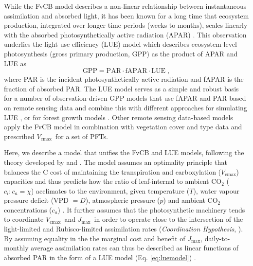 \documentclass{myreport}
\newcommand{\vcmax}{$V_{\text{cmax}}$}
\newcommand{\jmax}{$J_{\text{max}}$}
\begin{document}
While the FvCB model describes a non-linear relationship between instantaneous assimilation and absorbed light, it has been known for a long time that ecosystem production, integrated over longer time periods (weeks to months), scales linearly with the absorbed photosynthetically active radiation (APAR) \citep{monteith72, medlyn98}. This observation underlies the light use efficiency (LUE) model which describes ecosystem-level photosynthesis (gross primary production, GPP) as the product of APAR and LUE as
\begin{equation}
\label{eq:luemodel}
\text{GPP} = \text{PAR} \cdot \text{fAPAR} \cdot \text{LUE} \;,
\end{equation}
where PAR is the incident photosynthetically active radiation and fAPAR is the fraction of absorbed PAR. The LUE model serves as a simple and robust basis for a number of observation-driven GPP models that use fAPAR and PAR based on remote sensing data and combine this with different approaches for simulating LUE \citep{running04, Zhang2017-yr, field95rse}, or for forest growth models \citep{landsberg97fem}. Other remote sensing data-based models \citep{jiang16rse} apply the FvCB model in combination with vegetation cover and type data and prescribed \vcmax\ for a set of PFTs.

Here, we describe a model that unifies the FvCB and LUE models, following the theory developed by \citet{prentice14ecollett} and \citet{wang17natpl}. The model assumes an optimality principle that balances the C cost of maintaining the transpiration and carboxylation (\vcmax ) capacities and thus predicts how the ratio of leaf-internal to ambient CO$_2$ ($c_i:c_a = \chi$) acclimates to the environment, given temperature ($T$), water vapour pressure deficit (VPD $= D$), atmospheric pressure ($p$) and ambient CO$_2$ concentrations ($c_a$)  \citep{prentice14ecollett}. It further assumes that the photosynthetic machinery tends to coordinate \vcmax\ and \jmax\ in order to operate close to the intersection of the light-limited and Rubisco-limited assimilation rates (\textit{Coordination Hypothesis}, \citet{chen93, maire12po}). %
By assuming equality in the the marginal cost and benefit of \jmax , daily-to-monthly average assimilation rates can thus be described as linear functions of absorbed PAR in the form of a LUE model (Eq. \ref{eq:luemodel}) \citep{wang17natpl}.  
\end{document}
